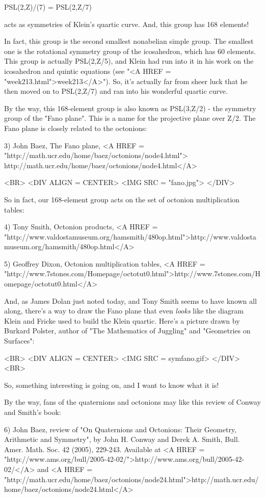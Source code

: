 PSL(2,Z)/\Gamma (7) = PSL(2,Z/7) 

acts as symmetries of Klein's quartic curve.  And, this group has
168 elements!  

In fact, this group is the second smallest nonabelian simple group.
The smallest one is the rotational symmetry group of the icosahedron,
which has 60 elements.  This group is actually PSL(2,Z/5), and
Klein had run into it in his work on the icosahedron and 
quintic equations (see "<A HREF = "week213.html">week213</A>").  
So, it's actually far from 
sheer luck that he then moved on to PSL(2,Z/7) and ran into his 
wonderful quartic curve.

By the way, this 168-element group is also known as PSL(3,Z/2) - 
the symmetry group of the "Fano plane".  This is a name for the 
projective plane over Z/2.  The Fano plane is closely related to 
the octonions:

3) John Baez, The Fano plane,
<A HREF = "http://math.ucr.edu/home/baez/octonions/node4.html">
http://math.ucr.edu/home/baez/octonions/node4.html</A>

<BR>
<DIV ALIGN = CENTER>
<IMG SRC = "fano.jpg">
</DIV>


So in fact, our 168-element group acts on the set of octonion
multiplication tables:

4) Tony Smith, Octonion products,
<A HREF = "http://www.valdostamuseum.org/hamsmith/480op.html">http://www.valdostamuseum.org/hamsmith/480op.html</A>

5) Geoffrey Dixon, Octonion multiplication tables,
<A HREF = "http://www.7stones.com/Homepage/octotut0.html">http://www.7stones.com/Homepage/octotut0.html</A>

And, as James Dolan just noted today, and Tony Smith seems to have known
all along, there's a way to draw the Fano plane that even \emph{looks} like 
the diagram Klein and Fricke used to build the Klein quartic.  Here's
a picture drawn by Burkard Polster, author of "The Mathematics
of Juggling" and "Geometries on Surfaces":

<BR>
<DIV ALIGN = CENTER>
<IMG SRC = symfano.gif>
</DIV>
<BR>

So, something interesting is going on, and I want to know what it is!

By the way, fans of the quaternions and octonions may like this
review of Conway and Smith's book:

6) John Baez, review of "On Quaternions and Octonions: Their Geometry,
Arithmetic and Symmetry", by John H. Conway and Derek A. Smith,
Bull. Amer. Math. Soc. 42 (2005), 229-243.  Available at 
<A HREF = "http://www.ams.org/bull/2005-42-02/">http://www.ams.org/bull/2005-42-02/</A> and 
<A HREF = "http://math.ucr.edu/home/baez/octonions/node24.html">http://math.ucr.edu/home/baez/octonions/node24.html</A>

